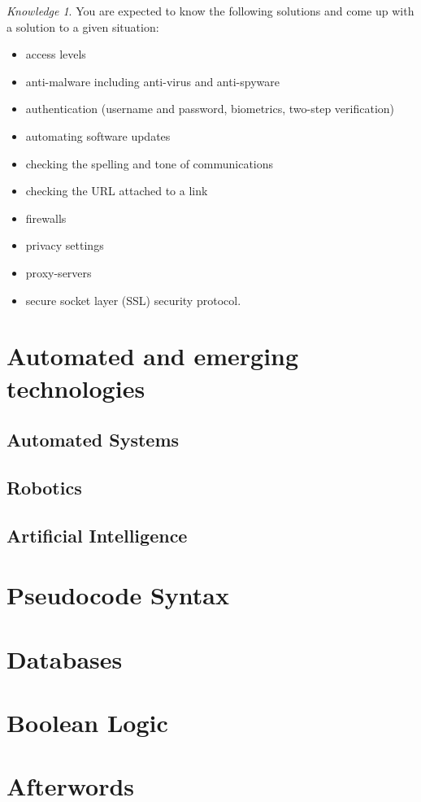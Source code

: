 \documentclass[8pt]{article}
\theoremstyle{remark}
\newtheorem{knowledge}[method]{Knowledge}
\begin{document}
            \begin{knowledge}
                You are expected to know the following solutions and come up with a solution to a given situation:
                \begin{itemize}
                    \item access levels
                    \item anti-malware including anti-virus and anti-spyware
                    \item authentication (username and password, biometrics, two-step verification)
                    \item automating software updates
                    \item checking the spelling and tone of communications
                    \item checking the URL attached to a link
                    \item firewalls
                    \item privacy settings
                    \item proxy-servers
                    \item secure socket layer (SSL) security protocol.
                \end{itemize}
            \end{knowledge}
    \section{Automated and emerging technologies}

        \subsection{Automated Systems}

        \subsection{Robotics}

        \subsection{Artificial Intelligence}

    \section{Pseudocode Syntax}

    \section{Databases}

    \section{Boolean Logic}

    \section*{Afterwords}
        
\end{document}
